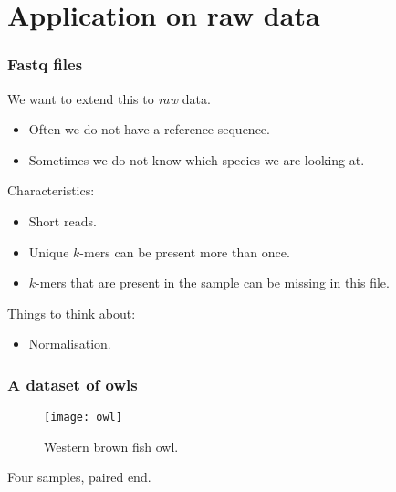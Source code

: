 \documentclass[slidestop]{beamer}
\begin{document}
\section{Application on raw data}
\begin{frame}
  \frametitle{Fastq files}

  We want to extend this to \emph{raw} data.
  \pause
  \begin{itemize}
    \item Often we do not have a reference sequence.
    \item Sometimes we do not know which species we are looking at.
  \end{itemize}
  \bigskip
  \pause

  Characteristics:
  \begin{itemize}
    \item Short reads.
    \item Unique $k$-mers can be present more than once.
    \item $k$-mers that are present in the sample can be missing in this file.
  \end{itemize}
  \bigskip
  \pause

  Things to think about:
  \begin{itemize}
    \item Normalisation.
  \end{itemize}
\end{frame}

\begin{frame}
  \frametitle{A dataset of owls}

  \begin{figure}
    \texttt{[image: owl]}
    \caption{Western brown fish owl.}
  \end{figure}
  \vspace{-0.25cm}
  Four samples, paired end.
\end{frame}
\end{document}
